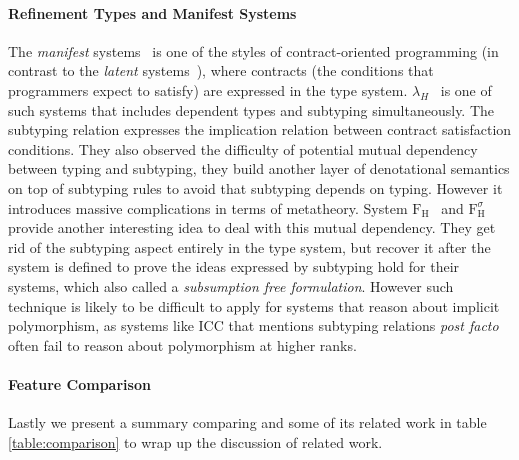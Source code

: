 \paragraph{Refinement Types and Manifest Systems}

The \emph{manifest} systems~\citep{manifestcontracts} is one of the styles of
contract-oriented programming (in contrast to the \emph{latent} systems~\citep{latentcontracts}),
where contracts (the conditions that programmers expect to satisfy) are expressed
in the type system. $\lambda_H$~\citep{hybridtypes,manifestcontracts} is one of such systems that
includes dependent types and subtyping simultaneously. The subtyping relation
expresses the implication relation between contract satisfaction conditions. They
also observed the difficulty of potential mutual dependency between typing and subtyping,
they build another layer of denotational semantics on top of
subtyping rules to avoid that subtyping depends on typing. However it introduces
massive complications in terms of metatheory. System $\mathrm{F}_\mathrm{H}$~\citep{fh} and $\mathrm{F}_\mathrm{H}^\sigma$
~\citep{fhsigma} provide another
interesting idea to deal with this mutual dependency. They get rid of the
subtyping aspect entirely in the type system, but recover it after the system is
defined to prove the ideas expressed by subtyping hold for their systems,
which \citet{fhsigma} also called a \emph{subsumption free formulation}.
However such technique is likely to be difficult to apply for systems that
reason about implicit polymorphism,
as systems like ICC\citep{miquel2001implicit} that mentions subtyping relations \emph{post facto}
often fail to reason about polymorphism at higher ranks.

\paragraph{Feature Comparison}

Lastly we present a summary comparing \name and some of its related work in
table \ref{table:comparison} to wrap up the discussion of related work.

